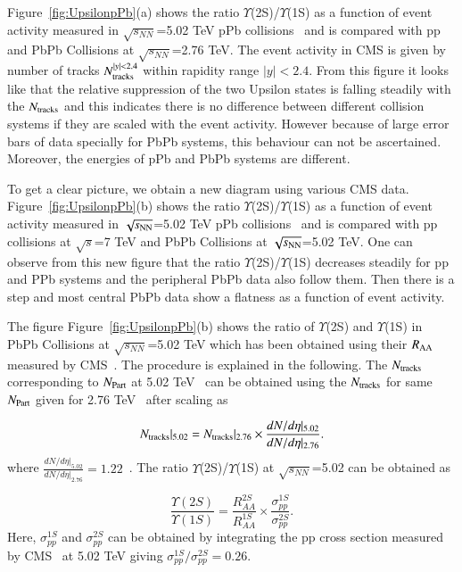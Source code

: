 Figure~\ref{fig:UpsilonpPb}(a) shows
the ratio $\Upsilon$(2S)/$\Upsilon$(1S) as a function of event activity measured in 
$\sqrt{s_{NN}}$=5.02 TeV pPb collisions~\cite{CMS:2013jsu} and is compared with pp
and PbPb Collisions at $\sqrt{s_{NN}}$=2.76 TeV.
The event activity in CMS is given by number of tracks $N_{\rm tracks}^{|y|<2.4}$ within rapidity
range $|y|<2.4$. From this figure it looks like that the relative suppression of
the two Upsilon states is falling steadily with the $N_{\rm tracks}$  and
this indicates there is no difference between different collision systems if
they are scaled with the event activity. However because of large error bars
of data specially for PbPb systems, this behaviour can not be ascertained.
Moreover, the energies of pPb and PbPb systems are different.

To get a clear picture, we obtain a new diagram using various CMS data.
Figure~\ref{fig:UpsilonpPb}(b) shows the ratio $\Upsilon$(2S)/$\Upsilon$(1S) as a function of
event activity measured in $\sqrt{s_{\rm NN}}$=5.02 TeV pPb collisions~\cite{CMS:2013jsu}
and is compared with pp collisions at $\sqrt{s}$=7 TeV \cite{CMS:2020fae} and
PbPb Collisions at $\sqrt{s_{\rm NN}}$=5.02 TeV. One can observe from this new figure
that the ratio $\Upsilon$(2S)/$\Upsilon$(1S) decreases steadily for pp and PPb systems
and the peripheral PbPb data also follow them. Then there is a step and most central PbPb
data show a flatness as a function of event activity. 

The figure Figure~\ref{fig:UpsilonpPb}(b) shows the ratio of $\Upsilon$(2S)
and $\Upsilon$(1S) in PbPb Collisions at
$\sqrt{s_{NN}}$=5.02 TeV which has been obtained using their $R_{\rm AA}$ measured by
CMS~\cite{CMS:2022wfi}. The procedure is explained in the following.
The $N_{\rm tracks}$ corresponding to $N_{\rm Part}$ at 5.02 TeV~\cite{CMS:2018zza}
can be obtained using the $N_{\rm tracks}$ for same $N_{\rm Part}$ given
for 2.76 TeV~\cite{CMS:2013jsu} after scaling as

\begin{equation}
N_{\rm tracks}|_{5.02} =  N_{\rm tracks}|_{2.76} \times \frac{dN/d\eta |_{5.02}} {dN/d\eta|_{2.76}}.
\end{equation}
where $\frac{dN/d\eta |_{5.02}} {dN/d\eta|_{2.76}}=1.22$~\cite{eta}.
The ratio $\Upsilon$(2S)/$\Upsilon$(1S) at $\sqrt{s_{NN}}$=5.02 can be obtained as 

\begin{equation}
\frac{\Upsilon(2S)}{\Upsilon(1S)} = \frac{R_{AA}^{2S}}{R_{AA}^{1S}} \times \frac{\sigma_{pp}^{1S}}{\sigma_{pp}^{2S}}.
\end{equation}
Here, $\sigma_{pp}^{1S}$ and $\sigma_{pp}^{2S}$ can be obtained by integrating the pp cross section
measured by CMS~\cite{CMS:2013jsu} at 5.02 TeV giving $\sigma_{pp}^{1S}/\sigma_{pp}^{2S}=0.26$.





